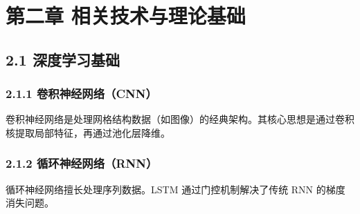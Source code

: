 \documentclass{harryopo-mathnotes}
\begin{document}
\section{第二章
相关技术与理论基础}\label{ux7b2cux4e8cux7ae0-ux76f8ux5173ux6280ux672fux4e0eux7406ux8bbaux57faux7840}

\subsection{2.1
深度学习基础}\label{ux6df1ux5ea6ux5b66ux4e60ux57faux7840}

\subsubsection{2.1.1
卷积神经网络（CNN）}\label{ux5377ux79efux795eux7ecfux7f51ux7edccnn}

卷积神经网络是处理网格结构数据（如图像）的经典架构。其核心思想是通过卷积核提取局部特征，再通过池化层降维。

\subsubsection{2.1.2
循环神经网络（RNN）}\label{ux5faaux73afux795eux7ecfux7f51ux7edcrnn}

循环神经网络擅长处理序列数据。LSTM 通过门控机制解决了传统 RNN
的梯度消失问题。

\begin{Shaded}
\begin{Highlighting}[]

     \NormalTok{(}\OperatorTok{=}\NormalTok{):}
        \NormalTok{()}
        \OperatorTok{=}
\OperatorTok{=}
\OperatorTok{=}
\OperatorTok{=}
\OperatorTok{=}\NormalTok{,}
\OperatorTok{=}
\NormalTok{        )}
        \OperatorTok{=}

\OperatorTok{=} 
         \NormalTok{.fc(lstm\_out[:, }\OperatorTok{{-}}\NormalTok{, :])}
\end{Highlighting}
\end{Shaded}
\end{document}
